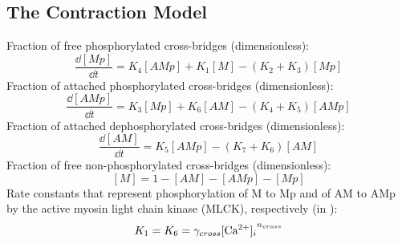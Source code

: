 \subsection{The Contraction Model}
%
Fraction of free phosphorylated cross-bridges (dimensionless):
\begin{equation} \label{eq:dMpdt}
\frac{\dd[Mp]}{\dd t} = K_{4}[AMp] +K_{1} [M] - ( K_{2} + K_{3} ) [Mp]
\end{equation}
%
Fraction of attached phosphorylated cross-bridges (dimensionless):
\begin{equation} \label{eq:dAMpdt}
\frac{\dd[AMp]}{\dd t} =K_{3} [Mp] + K_{6} [AM] - ( K_{4} + K_{5} )[AMp]
\end{equation} 
%
Fraction of attached dephosphorylated cross-bridges (dimensionless):
\begin{equation} \label{eq:dAMdt}
\frac{\dd[AM]}{\dd t} = K_{5} [AMp]-(K_{7}+K_{6})[AM]
\end{equation}
%
Fraction of free non-phosphorylated cross-bridges (dimensionless):
\begin{equation} \label{eq:dMdt}
[M]=1-[AM]-[AMp]-[Mp]
\end{equation}
%
Rate constants that represent phosphorylation of M to Mp and of AM to AMp by the active myosin light chain kinase (MLCK), respectively (in \pers):
\begin{equation} \label{eq:gamma}
K_{1} = K_{6} = \gamma_{cross} \text{[Ca$^{2+}$]$_i$} ^{n_{cross}}
\end{equation}
%
%
